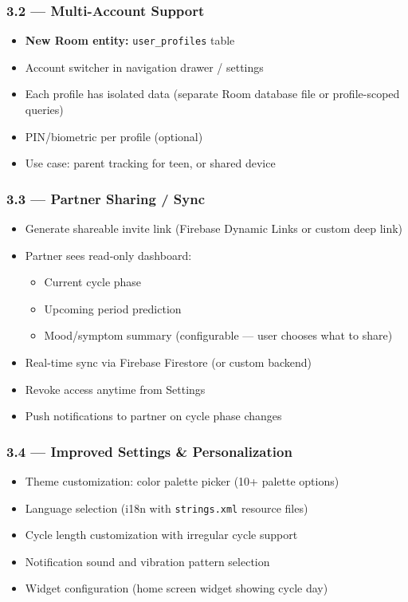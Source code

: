 \documentclass[12pt,a4paper]{article}
\begin{document}
\subsubsection{3.2 — Multi-Account Support}
\begin{itemize}[leftmargin=1.5em]
  \item \textbf{New Room entity:} \texttt{user\_profiles} table
  \item Account switcher in navigation drawer / settings
  \item Each profile has isolated data (separate Room database file or profile-scoped queries)
  \item PIN/biometric per profile (optional)
  \item Use case: parent tracking for teen, or shared device
\end{itemize}

\subsubsection{3.3 — Partner Sharing / Sync}
\begin{itemize}[leftmargin=1.5em]
  \item Generate shareable invite link (Firebase Dynamic Links or custom deep link)
  \item Partner sees read-only dashboard:
  \begin{itemize}
    \item Current cycle phase
    \item Upcoming period prediction
    \item Mood/symptom summary (configurable — user chooses what to share)
  \end{itemize}
  \item Real-time sync via Firebase Firestore (or custom backend)
  \item Revoke access anytime from Settings
  \item Push notifications to partner on cycle phase changes
\end{itemize}

\subsubsection{3.4 — Improved Settings \& Personalization}
\begin{itemize}[leftmargin=1.5em]
  \item Theme customization: color palette picker (10+ palette options)
  \item Language selection (i18n with \texttt{strings.xml} resource files)
  \item Cycle length customization with irregular cycle support
  \item Notification sound and vibration pattern selection
  \item Widget configuration (home screen widget showing cycle day)
\end{itemize}
\end{document}
